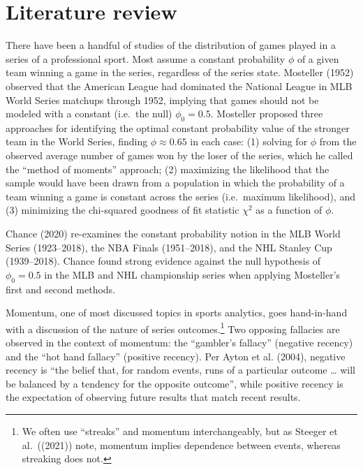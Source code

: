 \documentclass{article}
\begin{document}
\hypertarget{literature-review}{%
\section{Literature review}\label{literature-review}}

There have been a handful of studies of the distribution of games played
in a series of a professional sport. Most assume a constant probability
\(\phi\) of a given team winning a game in the series, regardless of the
series state. Mosteller (1952) observed that the American League had
dominated the National League in MLB World Series matchups through 1952,
implying that games should not be modeled with a constant (i.e.~the
null) \(\phi_0 = 0.5\). Mosteller proposed three approaches for
identifying the optimal constant probability value of the stronger team
in the World Series, finding \(\phi \approx 0.65\) in each case: (1)
solving for \(\phi\) from the observed average number of games won by
the loser of the series, which he called the ``method of moments''
approach; (2) maximizing the likelihood that the sample would have been
drawn from a population in which the probability of a team winning a
game is constant across the series (i.e.~maximum likelihood), and (3)
minimizing the chi-squared goodness of fit statistic \(\chi^2\) as a
function of \(\phi\).

Chance (2020) re-examines the constant probability notion in the MLB
World Series (1923--2018), the NBA Finals (1951--2018), and the NHL
Stanley Cup (1939--2018). Chance found strong evidence against the null
hypothesis of \(\phi_0 = 0.5\) in the MLB and NHL championship series
when applying Mosteller's first and second methods.

Momentum, one of most discussed topics in sports analytics, goes
hand-in-hand with a discussion of the nature of series
outcomes.\footnote{We often use ``streaks'' and momentum
  interchangeably, but as Steeger et al.~((2021)) note, momentum implies
  dependence between events, whereas streaking does not.} Two opposing
fallacies are observed in the context of momentum: the ``gambler's
fallacy'' (negative recency) and the ``hot hand fallacy'' (positive
recency). Per Ayton et al. (2004), negative recency is ``the belief
that, for random events, runs of a particular outcome \ldots{} will be
balanced by a tendency for the opposite outcome'', while positive
recency is the expectation of observing future results that match recent
results.
\end{document}
